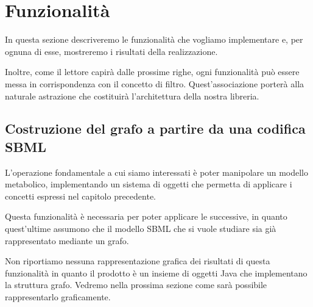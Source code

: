 \section{Funzionalit\`a}
\label{section:use-cases}

In questa sezione descriveremo le funzionalit\`a che vogliamo
implementare e, per ognuna di esse, mostreremo i risultati della
realizzazione.

Inoltre, come il lettore capir\`a dalle prossime righe, ogni
funzionalit\`a pu\`o essere messa in corrispondenza con il concetto di
filtro. Quest'associazione porter\`a alla naturale astrazione che
costituir\`a l'architettura della nostra libreria.

\subsection{Costruzione del grafo a partire da una codifica SBML}
L'operazione fondamentale a cui siamo interessati \`e poter manipolare
un modello metabolico, implementando un sistema di oggetti che
permetta di applicare i concetti espressi nel capitolo precedente.

Questa funzionalit\`a \`e necessaria per poter applicare le
successive, in quanto quest'ultime assumono che il modello SBML che si
vuole studiare sia gi\`a rappresentato mediante un grafo.

Non riportiamo nessuna rappresentazione grafica dei risultati di
questa funzionalit\`a in quanto il prodotto \`e un insieme di oggetti
Java che implementano la struttura grafo. Vedremo nella prossima
sezione come sar\`a possibile rappresentarlo graficamente.

